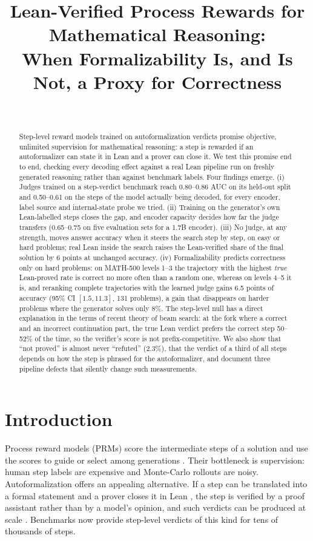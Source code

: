 \documentclass[10pt]{article}
\title{Lean-Verified Process Rewards for Mathematical Reasoning:\\ When Formalizability Is, and Is Not, a Proxy for Correctness}
\author{\name \todo{author name} \email \todo{email} \\
      \addr \todo{affiliation}}
\begin{document}
\maketitle

\begin{abstract}
Step-level reward models trained on autoformalization verdicts promise objective, unlimited supervision for mathematical reasoning: a step is rewarded if an autoformalizer can state it in Lean and a prover can close it. We test this promise end to end, checking every decoding effect against a real Lean pipeline run on freshly generated reasoning rather than against benchmark labels. Four findings emerge. (i) Judges trained on a step-verdict benchmark reach 0.80--0.86 AUC on its held-out split and 0.50--0.61 on the steps of the model actually being decoded, for every encoder, label source and internal-state probe we tried. (ii) Training on the generator's own Lean-labelled steps closes the gap, and encoder capacity decides how far the judge transfers (0.65--0.75 on five evaluation sets for a 1.7B encoder). (iii) No judge, at any strength, moves answer accuracy when it steers the search step by step, on easy or hard problems; real Lean inside the search raises the Lean-verified share of the final solution by 6 points at unchanged accuracy. (iv) Formalizability predicts correctness only on hard problems: on MATH-500 levels 1--3 the trajectory with the highest \emph{true} Lean-proved rate is correct no more often than a random one, whereas on levels 4--5 it is, and reranking complete trajectories with the learned judge gains 6.5 points of accuracy (95\% CI $[1.5, 11.3]$, 131 problems), a gain that disappears on harder problems where the generator solves only 8\%. The step-level null has a direct explanation in the terms of recent theory of beam search: at the fork where a correct and an incorrect continuation part, the true Lean verdict prefers the correct step 50--52\% of the time, so the verifier's score is not prefix-competitive. We also show that ``not proved'' is almost never ``refuted'' (2.3\%), that the verdict of a third of all steps depends on how the step is phrased for the autoformalizer, and document three pipeline defects that silently change such measurements.
\end{abstract}

\section{Introduction}

Process reward models (PRMs) score the intermediate steps of a solution and use the scores to guide or select among generations \citep{lightman2023lets,wang2024mathshepherd}. Their bottleneck is supervision: human step labels are expensive and Monte-Carlo rollouts are noisy. Autoformalization offers an appealing alternative. If a step can be translated into a formal statement \citep{wu2022autoformalization} and a prover closes it in Lean \citep{moura2021lean4,mathlib2020}, the step is verified by a proof assistant rather than by a model's opinion, and such verdicts can be produced at scale \citep{zhou2024dtv}. Benchmarks now provide step-level verdicts of this kind for tens of thousands of steps.
\end{document}
